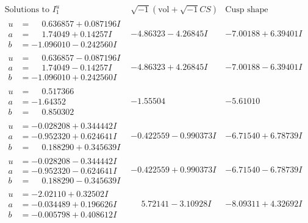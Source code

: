 \documentclass[1p]{elsarticle_modified}
\theoremstyle{definition}
\newcommand{\I}{\sqrt{-1}}
\begin{document}
$$\begin{array}{c|c|c}  
\text{Solutions to }I^u_{1}& \I (\text{vol} + \sqrt{-1}CS) & \text{Cusp shape}\\
 \hline 
\begin{aligned}
u &= \phantom{-}0.636857 + 0.087196 I \\
a &= \phantom{-}1.74049 + 0.14257 I \\
b &= -1.096010 - 0.242560 I\end{aligned}
 & -4.86323 - 4.26845 I & -7.00188 + 6.39401 I \\ \hline\begin{aligned}
u &= \phantom{-}0.636857 - 0.087196 I \\
a &= \phantom{-}1.74049 - 0.14257 I \\
b &= -1.096010 + 0.242560 I\end{aligned}
 & -4.86323 + 4.26845 I & -7.00188 - 6.39401 I \\ \hline\begin{aligned}
u &= \phantom{-}0.517366\phantom{ +0.000000I} \\
a &= -1.64352\phantom{ +0.000000I} \\
b &= \phantom{-}0.850302\phantom{ +0.000000I}\end{aligned}
 & -1.55504\phantom{ +0.000000I} & -5.61010\phantom{ +0.000000I} \\ \hline\begin{aligned}
u &= -0.028208 + 0.344442 I \\
a &= -0.952320 + 0.624641 I \\
b &= \phantom{-}0.188290 + 0.345639 I\end{aligned}
 & -0.422559 - 0.990373 I & -6.71540 + 6.78739 I \\ \hline\begin{aligned}
u &= -0.028208 - 0.344442 I \\
a &= -0.952320 - 0.624641 I \\
b &= \phantom{-}0.188290 - 0.345639 I\end{aligned}
 & -0.422559 + 0.990373 I & -6.71540 - 6.78739 I \\ \hline\begin{aligned}
u &= -2.02110 + 0.32502 I \\
a &= -0.034489 + 0.196626 I \\
b &= -0.005798 + 0.408612 I\end{aligned}
 & \phantom{-}5.72141 - 3.10928 I & -8.09311 + 4.32692 I \\ \hline\begin{aligned}

\end{aligned}
\end{array}$$
\end{document}
